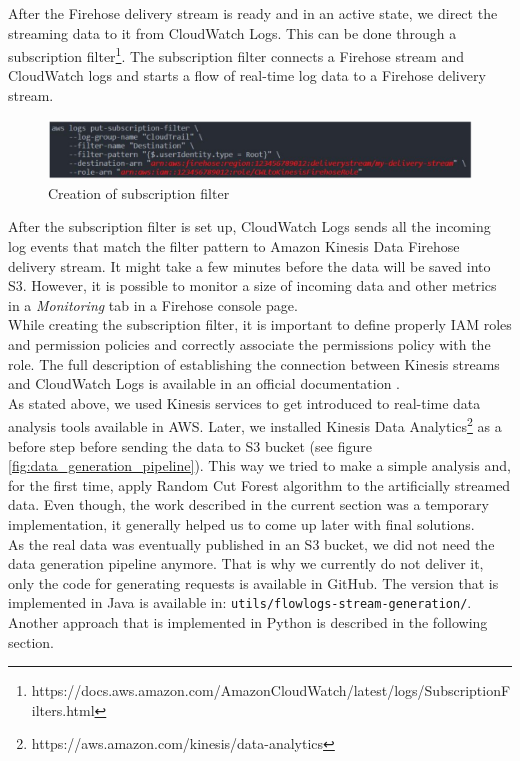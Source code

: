         After the Firehose delivery stream is ready and in an active state, we direct the streaming data to it from CloudWatch Logs. This can be done through a subscription filter\footnote{ https://docs.aws.amazon.com/AmazonCloudWatch/latest/logs/SubscriptionFilters.html}. The subscription filter connects a Firehose stream and CloudWatch logs and starts a flow of real-time log data to a Firehose delivery stream.
        \begin{figure}[h]
            \centering
            \includegraphics[width=1\textwidth]{images/subscription-filter-creation.png}
            \caption{Creation of subscription filter}
            \label{fig:subscription_filter_creation}
        \end{figure}
        \FloatBarrier    
        After the subscription filter is set up, CloudWatch Logs sends all the incoming log events that match the filter pattern to Amazon Kinesis Data Firehose delivery stream. It might take a few minutes before the data will be saved into S3. However, it is possible to monitor a size of incoming data and other metrics in a \textit{Monitoring} tab in a Firehose console page. \\
        While creating the subscription filter, it is important to define properly IAM roles and permission policies and correctly associate the permissions policy with the role. The full description of establishing the connection between Kinesis streams and CloudWatch Logs is available in an official documentation \cite{awsFirehoseSubFilter}.\\
        As stated above, we used Kinesis services to get introduced to real-time data analysis tools available in AWS. Later, we installed Kinesis Data Analytics\footnote{https://aws.amazon.com/kinesis/data-analytics} as a before step before sending the data to S3 bucket (see figure \ref{fig:data_generation_pipeline}). This way we tried to make a simple analysis and, for the first time, apply Random Cut Forest algorithm to the artificially streamed data. Even though, the work described in the current section was a temporary implementation, it generally helped us to come up later with final solutions.\\
        As the real data was eventually published in an S3 bucket, we did not need the data generation pipeline anymore. That is why we currently do not deliver it, only the code for generating requests is available in GitHub. The version that is implemented in Java is available in: \lstinline{utils/flowlogs-stream-generation/}.\\
        Another approach that is implemented in Python is described in the following section.
      
